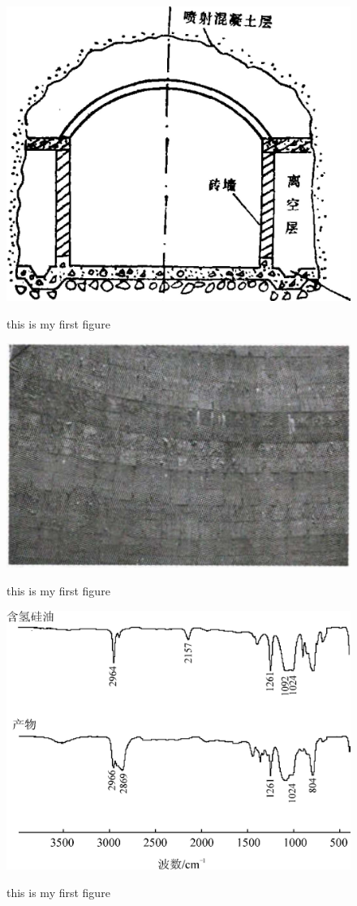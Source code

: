 \documentclass{report}
\begin{document}
\begin{figure}
  \centering
  \includegraphics[scale=0.5]{tu1.jpg}\\
  \caption{this is my first figure}
\end{figure}

\begin{figure}
  \centering
  \includegraphics[scale=0.5]{tu2.jpg}\\
  \caption{this is my first figure}
\end{figure}

\begin{figure}
  \centering
  \includegraphics[scale=0.5]{tu3.png}\\
  \caption{this is my first figure}
\end{figure}
\end{document}
